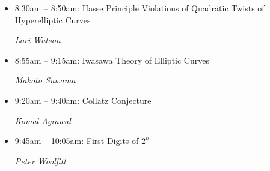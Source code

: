 \documentclass[oneside]{amsart}
\begin{document}
\begin{itemize}
\setlength\itemsep{1em}

\item 8:30am -- 8:50am: Hasse Principle Violations of Quadratic Twists of Hyperelliptic Curves \\ \vspace{-1.5em} \begin{flushright}\textit{ Lori Watson }\end{flushright}
\item 8:55am -- 9:15am: Iwasawa Theory of Elliptic Curves \\ \vspace{-1.5em} \begin{flushright}\textit{ Makoto Suwama }\end{flushright}
\item 9:20am -- 9:40am: Collatz Conjecture  \\ \vspace{-1.5em} \begin{flushright}\textit{ Komal Agrawal }\end{flushright}
\item 9:45am -- 10:05am: First Digits of $2^n$ \\ \vspace{-1.5em} \begin{flushright}\textit{ Peter Woolfitt }\end{flushright}

\end{itemize}
\end{document}
